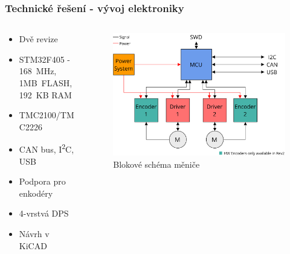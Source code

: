 \documentclass[%
  12pt,       				%
	t,                  %
	aspectratio=1610,   %
	unicode,						%
]{beamer}				    	%
\begin{document}
\begin{frame}
	\frametitle{Technické řešení - vývoj elektroniky}
	\begin{columns}[T] 								%
		\begin{column}{0.4\textwidth}
			\begin{itemize}
				\item Dvě revize
				\item STM32F405 - 168~MHz, 1MB~FLASH, 192~KB RAM
				\item TMC2100/TMC2226
				\item CAN bus, I\textsuperscript{2}C, USB
				\item Podpora pro enkodéry
				\item 4-vrstvá DPS
				\item Návrh v KiCAD
			\end{itemize}
		\end{column}
		\begin{column}{0.6\textwidth}		%
			\begin{figure}%
				\centering              %
				\includegraphics[width=0.8\columnwidth]{../Thesis/obrazky/sm4_block_diagram}
				\caption{Blokové schéma měniče}%
				\label{fig:sm4_block}
			\end{figure}
		\end{column}
	\end{columns}
\end{frame}
\end{document}
